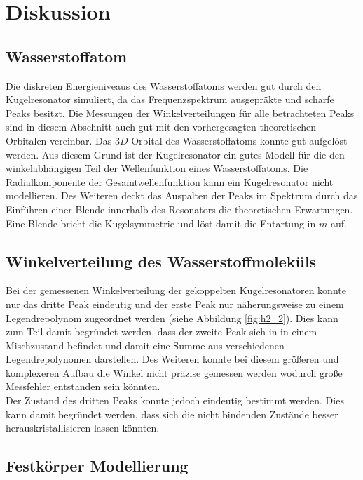 \section{Diskussion}
\label{sec:diskussion}

\subsection{Wasserstoffatom}

Die diskreten Energieniveaus des Wasserstoffatoms werden gut durch den Kugelresonator simuliert, da das Frequenzspektrum ausgepräkte und scharfe Peaks besitzt. 
Die Messungen der Winkelverteilungen für alle betrachteten Peaks sind in diesem Abschnitt auch gut mit den vorhergesagten theoretischen Orbitalen vereinbar. Das $3D$ Orbital des Wasserstoffatoms konnte gut aufgelöst werden.
Aus diesem Grund ist der Kugelresonator ein gutes Modell für die den winkelabhängigen Teil der Wellenfunktion eines Wasserstoffatoms. Die Radialkomponente der Gesamtwellenfunktion kann ein Kugelresonator nicht modellieren.  
Des Weiteren deckt das Auspalten der Peaks im Spektrum durch das Einführen einer Blende innerhalb des Resonators die theoretischen Erwartungen. Eine Blende bricht die Kugelsymmetrie und löst damit die Entartung in $m$ auf. 
\subsection{Winkelverteilung des Wasserstoffmoleküls}

Bei der gemessenen Winkelverteilung der gekoppelten Kugelresonatoren konnte nur das dritte Peak eindeutig und der erste Peak nur näherungsweise zu einem Legendrepolynom zugeordnet werden (siehe Abbildung \ref{fig:h2_2}). 
Dies kann zum Teil damit begründet werden, dass der zweite Peak sich in in einem Mischzustand befindet und damit eine Summe aus verschiedenen Legendrepolynomen darstellen. 
Des Weiteren konnte bei diesem größeren und komplexeren Aufbau die Winkel nicht präzise gemessen werden wodurch große Messfehler entstanden sein könnten. \\
Der Zustand des dritten Peaks konnte jedoch eindeutig bestimmt werden. Dies kann damit begründet werden, dass sich die nicht bindenden Zustände besser herauskristallisieren lassen könnten. 
\subsection{Festkörper Modellierung}

